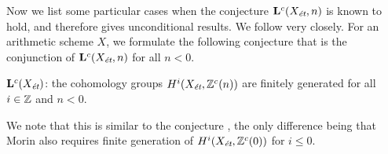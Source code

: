 \documentclass{article}
\numberwithin{equation}{section}
\begin{document}




Now we list some particular cases when the conjecture $\mathbf{L}^c (X_\et,n)$
is known to hold, and therefore gives unconditional results. We follow
\cite[\S 5]{Morin-2014} very closely. For an arithmetic scheme $X$, we formulate
the following conjecture that is the conjunction of $\mathbf{L}^c (X_\et,n)$ for
all $n < 0$.

\begin{conjecture}
  $\mathbf{L}^c (X_\et)$: the cohomology groups $H^i (X_\et, \ZZ^c (n))$ are
  finitely generated for all $i \in \ZZ$ and $n < 0$.
\end{conjecture}

We note that this is similar to the conjecture
\cite[Definition~5.8]{Morin-2014}, the only difference being that Morin also
requires finite generation of $H^i (X_\et, \ZZ^c (0))$ for $i \le 0$.
\end{document}
